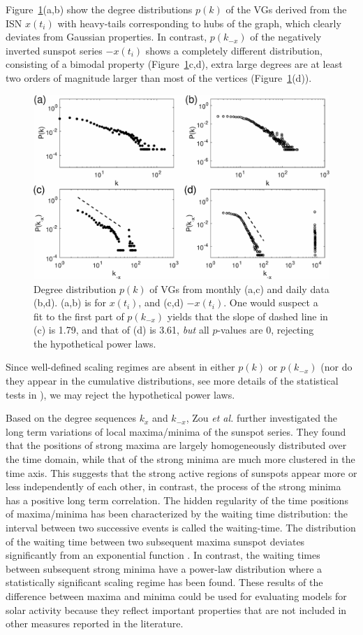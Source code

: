 		Figure~\ref{sn_sa_data}(a,b) show the degree distributions $p(k)$ of the VGs derived from the ISN $x(t_i)$ with heavy-tails corresponding to hubs of the graph, which clearly deviates from Gaussian properties. In contrast, $p(k_{-x})$ of the negatively inverted sunspot series $-x(t_i)$ shows a completely different distribution, consisting of a bimodal property (Figure~\ref{sn_sa_data}c,d), extra large degrees are at least two orders of magnitude larger than most of the vertices (Figure~\ref{sn_sa_data}(d)).
		\begin{figure}
  		\centering
			\includegraphics[width=0.8\columnwidth]{Chapter07_Applications/pdf_degreeBelgimN.eps}
		\caption{Degree distribution $p(k)$ of VGs from monthly (a,c) and daily data (b,d). (a,b) is for $x(t_i)$, and (c,d) $-x(t_i)$. One would suspect a fit to the first part of $p(k_{-x})$ yields that the slope of dashed line in (c) is 1.79, and that of (d) is 3.61, {\emph{but}} all $p$-values are $0$, rejecting the hypothetical power laws.} \label{sn_sa_data}
		\end{figure}	
		Since well-defined scaling regimes are absent in either $p(k)$ or $p(k_{-x})$ (nor do they appear in the cumulative distributions, see more details of the statistical tests in \cite{Zou2014a}), we may reject the hypothetical power laws. 
		
		Based on the degree sequences $k_x$ and $k_{-x}$, Zou {\textit {et al.}} \cite{Zou2014a} further investigated the long term variations of local maxima/minima of the sunspot series.  They found that the positions of strong maxima are largely homogeneously distributed over the time domain, while that of the strong minima are much more clustered in the time axis. This suggests that the strong active regions of sunspots appear more or less independently of each other, in contrast, the process of the strong minima has a positive long term correlation. The hidden regularity of the time positions of maxima/minima has been characterized by the waiting time distribution: the interval between two successive events is called the waiting-time. The distribution of the waiting time between two subsequent maxima sunspot deviates significantly from an exponential function \cite{Zou2014a}. In contrast, the waiting times between subsequent strong minima have a power-law distribution where a statistically significant scaling regime has been found. These results of the difference between maxima and minima could be used for evaluating models for solar activity because they reflect important properties that are not included in other measures reported in the literature.
		
